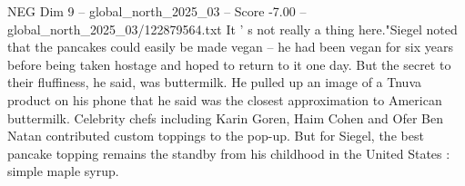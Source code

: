 \begin{textsample}{NEG Dim 9 – global\_north\_2025\_03 – Score -7.00 – global\_north\_2025\_03/122879564.txt}
It ' s not really a thing here."Siegel noted that the pancakes could easily be made vegan -- he had been vegan for six years before being taken hostage and hoped to return to it one day.
But the secret to their fluffiness, he said, was buttermilk.
He pulled up an image of a Tnuva product on his phone that he said was the closest approximation to American buttermilk.
Celebrity chefs including Karin Goren, Haim Cohen and Ofer Ben Natan contributed custom toppings to the pop-up.
But for Siegel, the best pancake topping remains the standby from his childhood in the United States : simple maple syrup.

\end{textsample}
